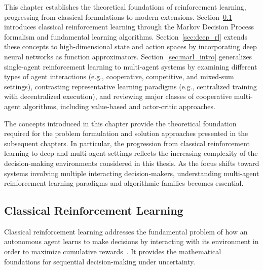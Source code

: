 This chapter establishes the theoretical foundations of reinforcement learning, progressing from classical formulations to modern extensions. Section~\ref{sec:classical_rl} introduces classical reinforcement learning through the Markov Decision Process formalism and fundamental learning algorithms. Section~\ref{sec:deep_rl} extends these concepts to high-dimensional state and action spaces by incorporating deep neural networks as function approximators. Section~\ref{sec:marl_intro} generalizes single-agent reinforcement learning to multi-agent systems by examining different types of agent interactions (e.g., cooperative, competitive, and mixed-sum settings), contrasting representative learning paradigms (e.g., centralized training with decentralized execution), and reviewing major classes of cooperative multi-agent algorithms, including value-based and actor-critic approaches.

The concepts introduced in this chapter provide the theoretical foundation required for the problem formulation and solution approaches presented in the subsequent chapters. In particular, the progression from classical reinforcement learning to deep and multi-agent settings reflects the increasing complexity of the decision-making environments considered in this thesis. As the focus shifts toward systems involving multiple interacting decision-makers, understanding multi-agent reinforcement learning paradigms and algorithmic families becomes essential.

\subsection{Classical Reinforcement Learning}
\label{sec:classical_rl}

Classical reinforcement learning addresses the fundamental problem of how an autonomous agent learns to make decisions by interacting with its environment in order to maximize cumulative rewards~\cite{sutton2018reinforcement}. It provides the mathematical foundations for sequential decision-making under uncertainty.


